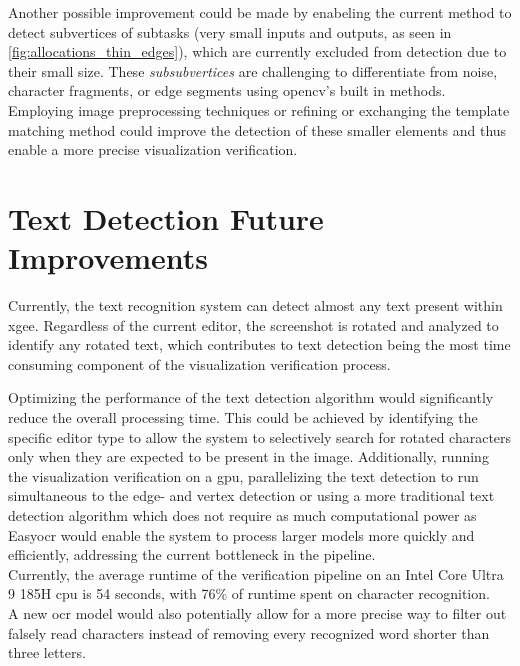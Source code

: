 Another possible improvement could be made by enabeling the current method to detect subvertices of subtasks (very small inputs and outputs, as seen in \autoref{fig:allocations_thin_edges}), which are currently excluded from detection due to their small size. These \textit{subsubvertices} are challenging to differentiate from noise, character fragments, or edge segments using \acrshort{opencv}'s built in methods. Employing image preprocessing techniques or refining or exchanging the template matching method could improve the detection of these smaller elements and thus enable a more precise visualization verification.

\section{Text Detection Future Improvements}
\label{sec:text_detection_future_improvements}
Currently, the text recognition system can detect almost any text present within \acrshort{xgee}. Regardless of the current editor, the screenshot is rotated and analyzed to identify any rotated text, which contributes to text detection being the most time consuming component of the visualization verification process.

Optimizing the performance of the text detection algorithm would significantly reduce the overall processing time. This could be achieved by identifying the specific editor type to allow the system to selectively search for rotated characters only when they are expected to be present in the image. Additionally, running the visualization verification on a \acrshort{gpu}, parallelizing the text detection to run simultaneous to the edge- and vertex detection or using a more traditional text detection algorithm which does not require as much computational power as Easy\acrshort{ocr} would enable the system to process larger models more quickly and efficiently, addressing the current bottleneck in the pipeline.\\
Currently, the average runtime of the verification pipeline on an Intel Core Ultra 9 185H \acrshort{cpu} is 54 seconds, with 76\% of runtime spent on character recognition.\\
A new \acrshort{ocr} model would also potentially allow for a more precise way to filter out falsely read characters instead of removing every recognized word shorter than three letters.

